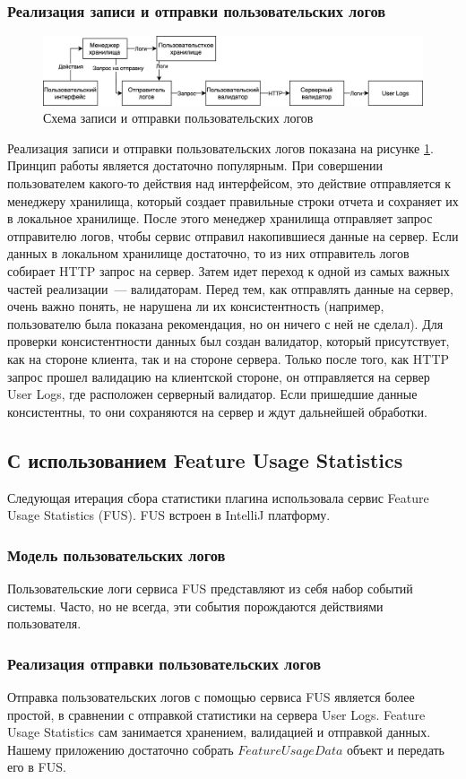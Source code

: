 \subsubsection{Реализация записи и отправки пользовательских логов}
\begin{figure}[!h]
\caption{Схема записи и отправки пользовательских логов}\label{jet-stat-logs}
\centering
\includegraphics[scale=0.15]{images/User Logs.png}
\end{figure}
Реализация записи и отправки пользовательских логов показана на рисунке \ref{jet-stat-logs}. Принцип работы является достаточно популярным. При совершении пользователем какого-то действия над интерфейсом, это действие отправляется к менеджеру хранилища, который создает правильные строки отчета и сохраняет их в локальное хранилище. После этого менеджер хранилища отправляет запрос отправителю логов, чтобы сервис отправил накопившиеся данные на сервер. Если данных в локальном хранилище достаточно, то из них отправитель логов собирает HTTP запрос на сервер. Затем идет переход к одной из самых важных частей реализации~--- валидаторам. Перед тем, как отправлять данные на сервер, очень важно понять, не нарушена ли их консистентность (например, пользователю была показана рекомендация, но он ничего с ней не сделал). Для проверки консистентности данных был создан валидатор, который присутствует, как на стороне клиента, так и на стороне сервера. Только после того, как HTTP запрос прошел валидацию на клиентской стороне, он отправляется на сервер User Logs, где расположен серверный валидатор. Если пришедшие данные консистентны, то они сохраняются на сервер и ждут дальнейшей обработки.
\subsection{С использованием Feature Usage Statistics}\label{fus-main}
Следующая итерация сбора статистики плагина использовала сервис Feature Usage Statistics (FUS). FUS встроен в IntelliJ платформу.
\subsubsection{Модель пользовательских логов}
Пользовательские логи сервиса FUS представляют из себя набор событий системы. Часто, но не всегда, эти события порождаются действиями пользователя.
\subsubsection{Реализация отправки пользовательских логов}
Отправка пользовательских логов с помощью сервиса FUS является более простой, в сравнении с отправкой статистики на сервера User Logs. Feature Usage Statistics сам занимается хранением, валидацией и отправкой данных. Нашему приложению достаточно собрать $FeatureUsageData$ объект и передать его в FUS.
\chapterconclusion